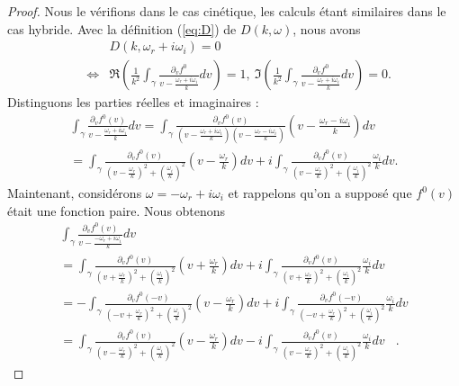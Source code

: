 \begin{proof}
  Nous le vérifions dans le cas cinétique, les calculs étant similaires dans le cas hybride. Avec la définition (\ref{eq:D}) de $D(k,\omega)$, nous avons 
  \begin{eqnarray*}
    &&D(k,\omega_r+i\omega_i)=0\\
    &\Leftrightarrow&
    \Re\left(\frac{1}{k^2}\int_\gamma\frac{\partial_vf^0}{v-\frac{\omega_r+i\omega_i}{k}}dv\right)=1,~\Im\left(\frac{1}{k^2}\int_\gamma\frac{\partial_vf^0}{v-\frac{\omega_r+i\omega_i}{k}}dv\right)=0. 
  \end{eqnarray*}
  Distinguons les parties réelles et imaginaires :
  \begin{eqnarray*}
    \int_\gamma\frac{\partial_vf^0(v)}{v-\frac{\omega_r+i\omega_i}{k}}dv=\int_\gamma\frac{\partial_vf^0(v)}{\left(v-\frac{\omega_r+i\omega_i}{k}\right)\left(v-\frac{\omega_r-i\omega_i}{k}\right)}\left(v-\frac{\omega_r-i\omega_i}{k}\right)dv\\
    =\int_\gamma\frac{\partial_vf^0(v)}{\left(v-\frac{\omega_r}{k}\right)^2+\left(\frac{\omega_i}{k}\right)^2}\left(v-\frac{\omega_r}{k}\right)dv+i\int_\gamma\frac{\partial_vf^0(v)}{\left(v-\frac{\omega_r}{k}\right)^2+\left(\frac{\omega_i}{k}\right)^2}\frac{\omega_i}{k}dv.
  \end{eqnarray*}
  Maintenant, considérons $\omega=-\omega_r+i\omega_i$ et rappelons qu'on a supposé que $f^0(v)$ était une fonction paire. Nous obtenons
  \begin{eqnarray*}
    \int_\gamma\frac{\partial_vf^0(v)}{v-\frac{-\omega_r+i\omega_i}{k}}dv~~~~~~~~~~~~~~~~~~~~~~~~~~~~~~~~~~~~~~~~~~~~~~~~~~~~~~~~~~~~~~~~~~~~~~~~~~~~~~~~\\
    =\int_\gamma\frac{\partial_vf^0(v)}{\left(v+\frac{\omega_r}{k}\right)^2+\left(\frac{\omega_i}{k}\right)^2}\left(v+\frac{\omega_r}{k}\right)dv+i\int_\gamma\frac{\partial_vf^0(v)}{\left(v+\frac{\omega_r}{k}\right)^2+\left(\frac{\omega_i}{k}\right)^2}\frac{\omega_i}{k}dv~~~~\\
    =-\int_\gamma\frac{\partial_{v}f^0(-v)}{\left(-v+\frac{\omega_r}{k}\right)^2+\left(\frac{\omega_i}{k}\right)^2}\left(v-\frac{\omega_r}{k}\right)dv+i\int_\gamma\frac{\partial_vf^0(-v)}{\left(-v+\frac{\omega_r}{k}\right)^2+\left(\frac{\omega_i}{k}\right)^2}\frac{\omega_i}{k}dv\\
    =\int_\gamma\frac{\partial_vf^0(v)}{\left(v-\frac{\omega_r}{k}\right)^2+\left(\frac{\omega_i}{k}\right)^2}\left(v-\frac{\omega_r}{k}\right)dv-i\int_\gamma\frac{\partial_vf^0(v)}{\left(v-\frac{\omega_r}{k}\right)^2+\left(\frac{\omega_i}{k}\right)^2}\frac{\omega_i}{k}dv~~~~.

\end{eqnarray*}
\end{proof}
